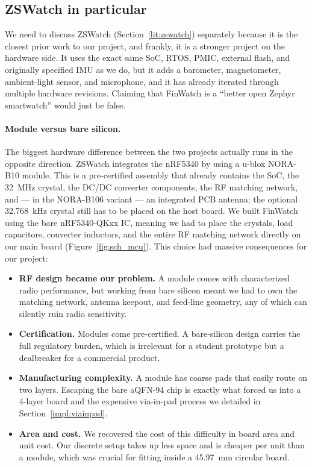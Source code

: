 \documentclass[12pt, a4paper]{article}
\begin{document}
\subsection{ZSWatch in particular}

We need to discuss ZSWatch (Section~\ref{lit:zswatch}) separately because it is the closest prior work to our project, and frankly, it is a stronger project on the hardware side. It uses the exact same SoC, RTOS, PMIC, external flash, and originally specified IMU as we do, but it adds a barometer, magnetometer, ambient-light sensor, and microphone, and it has already iterated through multiple hardware revisions. Claiming that FinWatch is a ``better open Zephyr smartwatch'' would just be false.

\paragraph{Module versus bare silicon.} The biggest hardware difference between the two projects actually runs in the opposite direction. ZSWatch integrates the nRF5340 by using a u-blox NORA-B10 module. This is a pre-certified assembly that already contains the SoC, the \SI{32}{\mega\hertz} crystal, the DC/DC converter components, the RF matching network, and --- in the NORA-B106 variant --- an integrated PCB antenna; the optional \SI{32.768}{\kilo\hertz} crystal still has to be placed on the host board. We built FinWatch using the bare nRF5340-QKxx IC, meaning we had to place the crystals, load capacitors, converter inductors, and the entire RF matching network directly on our main board (Figure~\ref{fig:sch_mcu}). This choice had massive consequences for our project:

\begin{itemize}
  \item \textbf{RF design became our problem.} A module comes with characterized radio performance, but working from bare silicon meant we had to own the matching network, antenna keepout, and feed-line geometry, any of which can silently ruin radio sensitivity.

  \item \textbf{Certification.} Modules come pre-certified. A bare-silicon design carries the full regulatory burden, which is irrelevant for a student prototype but a dealbreaker for a commercial product.

  \item \textbf{Manufacturing complexity.} A module has coarse pads that easily route on two layers. Escaping the bare aQFN-94 chip is exactly what forced us into a 4-layer board and the expensive via-in-pad process we detailed in Section~\ref{impl:viainpad}.

  \item \textbf{Area and cost.} We recovered the cost of this difficulty in board area and unit cost. Our discrete setup takes up less space and is cheaper per unit than a module, which was crucial for fitting inside a \SI{45.97}{\milli\metre} circular board.
\end{itemize}
\end{document}
